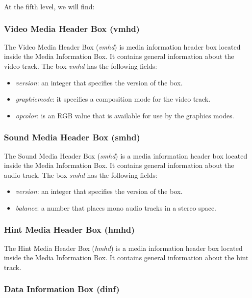 At the fifth level, we will find:

\subsubsection*{Video Media Header Box (vmhd)}

The Video Media Header Box (\emph{vmhd}) is media information header box located inside the Media Information Box. It contains general information about the video track. The box \emph{vmhd} has the following fields:

\begin{itemize}
\item \emph{version}: an integer that specifies the version of the box.
\item \emph{graphicmode}: it specifies a composition mode for the video track.
\item \emph{opcolor}: is an RGB value that is available for use by the graphics modes.
\end{itemize}

\subsubsection*{Sound Media Header Box (smhd)}

The Sound Media Header Box (\emph{smhd}) is a media information header box located inside the Media Information Box. It contains general information about the audio track. The box \emph{smhd} has the following fields:

\begin{itemize}
\item \emph{version}: an integer that specifies the version of the box.
\item \emph{balance}: a number that places mono audio tracks in a stereo space.
\end{itemize}

\subsubsection*{Hint Media Header Box (hmhd)}

The Hint Media Header Box (\emph{hmhd}) is a media information header box located inside the Media Information Box. It contains general information about the hint track.

\subsubsection*{Data Information Box (dinf)}


